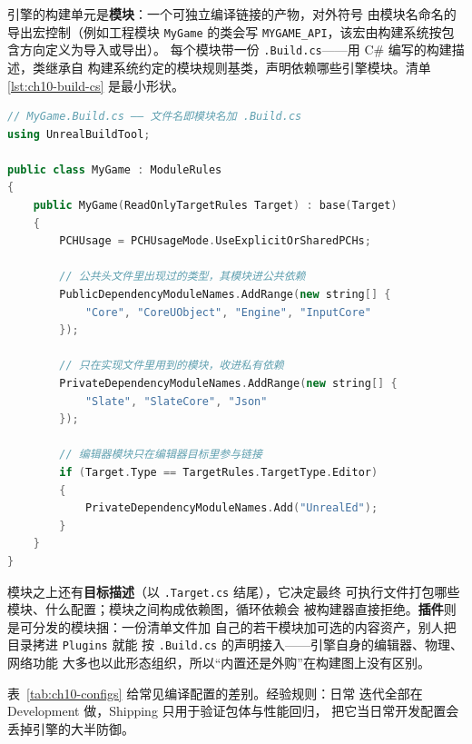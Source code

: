 \documentclass[12pt,a4paper,fontset=fandol]{ctexbook}
\newcommand{\Tp}[1]{\texttt{#1}}
\begin{document}
引擎的构建单元是\textbf{模块}：一个可独立编译链接的产物，对外符号
由模块名命名的导出宏控制（例如工程模块 \Tp{MyGame} 的类会写
\Tp{MYGAME\_API}，该宏由构建系统按包含方向定义为导入或导出）。
每个模块带一份 \Tp{.Build.cs}——用 C\# 编写的构建描述，类继承自
构建系统约定的模块规则基类，声明依赖哪些引擎模块。清单
\ref{lst:ch10-build-cs} 是最小形状。

\begin{lstlisting}[language=C++, style=cppstyle,
  caption={模块构建描述 \Tp{MyGame.Build.cs}（C\# 语法，此处仅示意字段族，枚举拼写以官方文档为准）},
  label={lst:ch10-build-cs}]
// MyGame.Build.cs —— 文件名即模块名加 .Build.cs
using UnrealBuildTool;

public class MyGame : ModuleRules
{
    public MyGame(ReadOnlyTargetRules Target) : base(Target)
    {
        PCHUsage = PCHUsageMode.UseExplicitOrSharedPCHs;

        // 公共头文件里出现过的类型，其模块进公共依赖
        PublicDependencyModuleNames.AddRange(new string[] {
            "Core", "CoreUObject", "Engine", "InputCore"
        });

        // 只在实现文件里用到的模块，收进私有依赖
        PrivateDependencyModuleNames.AddRange(new string[] {
            "Slate", "SlateCore", "Json"
        });

        // 编辑器模块只在编辑器目标里参与链接
        if (Target.Type == TargetRules.TargetType.Editor)
        {
            PrivateDependencyModuleNames.Add("UnrealEd");
        }
    }
}
\end{lstlisting}

模块之上还有\textbf{目标描述}（以 \Tp{.Target.cs} 结尾），它决定最终
可执行文件打包哪些模块、什么配置；模块之间构成依赖图，循环依赖会
被构建器直接拒绝。\textbf{插件}则是可分发的模块捆：一份清单文件加
自己的若干模块加可选的内容资产，别人把目录拷进 \Tp{Plugins} 就能
按 \Tp{.Build.cs} 的声明接入——引擎自身的编辑器、物理、网络功能
大多也以此形态组织，所以``内置还是外购''在构建图上没有区别。

表~\ref{tab:ch10-configs} 给常见编译配置的差别。经验规则：日常
迭代全部在 Development 做，Shipping 只用于验证包体与性能回归，
把它当日常开发配置会丢掉引擎的大半防御。
\end{document}
